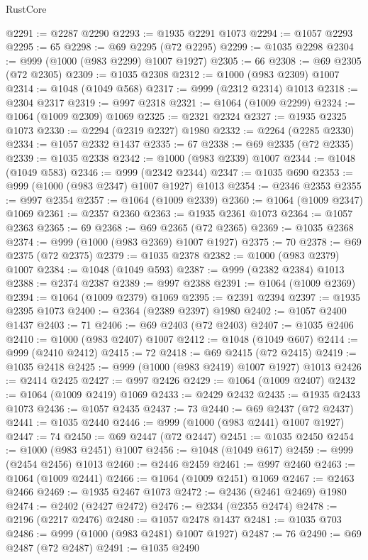 \begin{lexlean}{RustCore}
\begin{coremodule}
@2291 := @2287 @2290
@2293 := @1935 @2291 @1073
@2294 := @1057 @2293
@2295 := 65
@2298 := @69 @2295 (@72 @2295)
@2299 := @1035 @2298
@2304 := @999 (@1000 (@983 @2299) @1007 @1927)
@2305 := 66
@2308 := @69 @2305 (@72 @2305)
@2309 := @1035 @2308
@2312 := @1000 (@983 @2309) @1007
@2314 := @1048 (@1049 @568)
@2317 := @999 (@2312 @2314) @1013
@2318 := @2304 @2317
@2319 := @997 @2318
@2321 := @1064 (@1009 @2299)
@2324 := @1064 (@1009 @2309) @1069
@2325 := @2321 @2324
@2327 := @1935 @2325 @1073
@2330 := @2294 (@2319 @2327) @1980
@2332 := @2264 (@2285 @2330)
@2334 := @1057 @2332 @1437
@2335 := 67
@2338 := @69 @2335 (@72 @2335)
@2339 := @1035 @2338
@2342 := @1000 (@983 @2339) @1007
@2344 := @1048 (@1049 @583)
@2346 := @999 (@2342 @2344)
@2347 := @1035 @690
@2353 := @999 (@1000 (@983 @2347) @1007 @1927) @1013
@2354 := @2346 @2353
@2355 := @997 @2354
@2357 := @1064 (@1009 @2339)
@2360 := @1064 (@1009 @2347) @1069
@2361 := @2357 @2360
@2363 := @1935 @2361 @1073
@2364 := @1057 @2363
@2365 := 69
@2368 := @69 @2365 (@72 @2365)
@2369 := @1035 @2368
@2374 := @999 (@1000 (@983 @2369) @1007 @1927)
@2375 := 70
@2378 := @69 @2375 (@72 @2375)
@2379 := @1035 @2378
@2382 := @1000 (@983 @2379) @1007
@2384 := @1048 (@1049 @593)
@2387 := @999 (@2382 @2384) @1013
@2388 := @2374 @2387
@2389 := @997 @2388
@2391 := @1064 (@1009 @2369)
@2394 := @1064 (@1009 @2379) @1069
@2395 := @2391 @2394
@2397 := @1935 @2395 @1073
@2400 := @2364 (@2389 @2397) @1980
@2402 := @1057 @2400 @1437
@2403 := 71
@2406 := @69 @2403 (@72 @2403)
@2407 := @1035 @2406
@2410 := @1000 (@983 @2407) @1007
@2412 := @1048 (@1049 @607)
@2414 := @999 (@2410 @2412)
@2415 := 72
@2418 := @69 @2415 (@72 @2415)
@2419 := @1035 @2418
@2425 := @999 (@1000 (@983 @2419) @1007 @1927) @1013
@2426 := @2414 @2425
@2427 := @997 @2426
@2429 := @1064 (@1009 @2407)
@2432 := @1064 (@1009 @2419) @1069
@2433 := @2429 @2432
@2435 := @1935 @2433 @1073
@2436 := @1057 @2435
@2437 := 73
@2440 := @69 @2437 (@72 @2437)
@2441 := @1035 @2440
@2446 := @999 (@1000 (@983 @2441) @1007 @1927)
@2447 := 74
@2450 := @69 @2447 (@72 @2447)
@2451 := @1035 @2450
@2454 := @1000 (@983 @2451) @1007
@2456 := @1048 (@1049 @617)
@2459 := @999 (@2454 @2456) @1013
@2460 := @2446 @2459
@2461 := @997 @2460
@2463 := @1064 (@1009 @2441)
@2466 := @1064 (@1009 @2451) @1069
@2467 := @2463 @2466
@2469 := @1935 @2467 @1073
@2472 := @2436 (@2461 @2469) @1980
@2474 := @2402 (@2427 @2472)
@2476 := @2334 (@2355 @2474)
@2478 := @2196 (@2217 @2476)
@2480 := @1057 @2478 @1437
@2481 := @1035 @703
@2486 := @999 (@1000 (@983 @2481) @1007 @1927)
@2487 := 76
@2490 := @69 @2487 (@72 @2487)
@2491 := @1035 @2490

\end{coremodule}
\end{lexlean}
